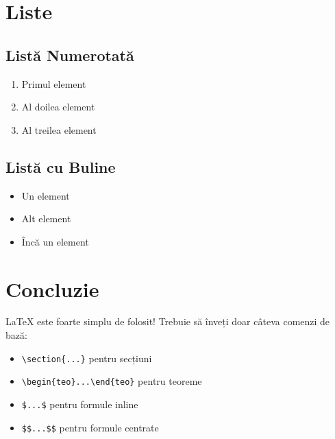 \documentclass[journal,noindent,headline,twoside,indent,a4paper,12pt]{paper_RDMI}
\begin{document}
\section{Liste}
\subsection{Listă Numerotată}
\begin{enumerate}
\item Primul element
\item Al doilea element
\item Al treilea element
\end{enumerate}

\subsection{Listă cu Buline}
\begin{itemize}
\item Un element
\item Alt element
\item Încă un element
\end{itemize}

\section{Concluzie}
LaTeX este foarte simplu de folosit! Trebuie să înveți doar câteva comenzi de bază:
\begin{itemize}
\item \texttt{\textbackslash section\{...\}} pentru secțiuni
\item \texttt{\textbackslash begin\{teo\}...\textbackslash end\{teo\}} pentru teoreme
\item \texttt{\$...\$} pentru formule inline
\item \texttt{\$\$...\$\$} pentru formule centrate
\end{itemize}
\end{document}
